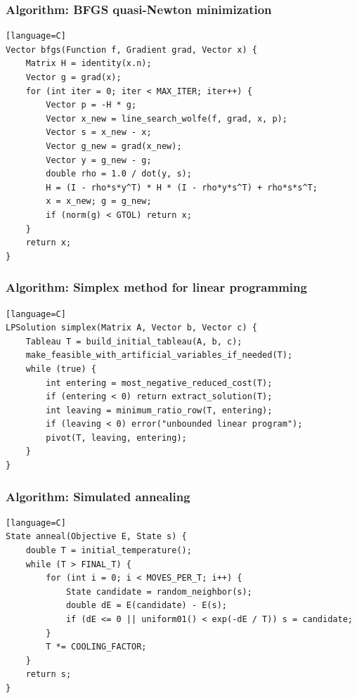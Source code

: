\documentclass[11pt]{article}
\begin{document}
\subsubsection{Algorithm: BFGS quasi-Newton minimization}\label{algorithm-bfgs-quasi-newton-minimization}

\begin{verbatim}[language=C]
Vector bfgs(Function f, Gradient grad, Vector x) {
    Matrix H = identity(x.n);
    Vector g = grad(x);
    for (int iter = 0; iter < MAX_ITER; iter++) {
        Vector p = -H * g;
        Vector x_new = line_search_wolfe(f, grad, x, p);
        Vector s = x_new - x;
        Vector g_new = grad(x_new);
        Vector y = g_new - g;
        double rho = 1.0 / dot(y, s);
        H = (I - rho*s*y^T) * H * (I - rho*y*s^T) + rho*s*s^T;
        x = x_new; g = g_new;
        if (norm(g) < GTOL) return x;
    }
    return x;
}
\end{verbatim}

\subsubsection{Algorithm: Simplex method for linear programming}\label{algorithm-simplex-method-for-linear-programming}

\begin{verbatim}[language=C]
LPSolution simplex(Matrix A, Vector b, Vector c) {
    Tableau T = build_initial_tableau(A, b, c);
    make_feasible_with_artificial_variables_if_needed(T);
    while (true) {
        int entering = most_negative_reduced_cost(T);
        if (entering < 0) return extract_solution(T);
        int leaving = minimum_ratio_row(T, entering);
        if (leaving < 0) error("unbounded linear program");
        pivot(T, leaving, entering);
    }
}
\end{verbatim}

\subsubsection{Algorithm: Simulated annealing}\label{algorithm-simulated-annealing}

\begin{verbatim}[language=C]
State anneal(Objective E, State s) {
    double T = initial_temperature();
    while (T > FINAL_T) {
        for (int i = 0; i < MOVES_PER_T; i++) {
            State candidate = random_neighbor(s);
            double dE = E(candidate) - E(s);
            if (dE <= 0 || uniform01() < exp(-dE / T)) s = candidate;
        }
        T *= COOLING_FACTOR;
    }
    return s;
}
\end{verbatim}
\end{document}
